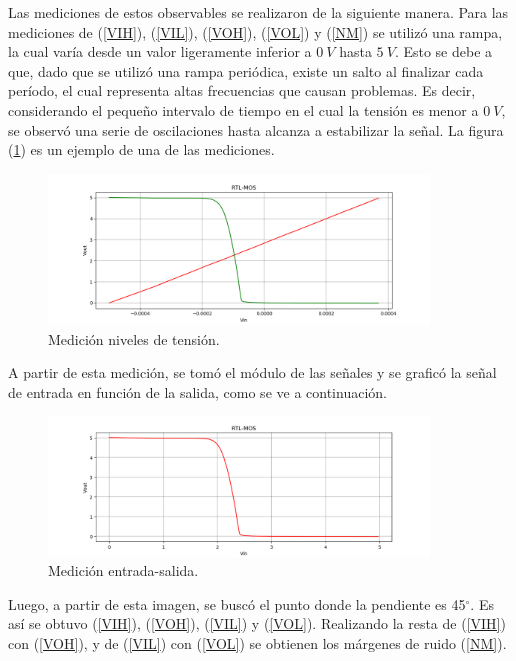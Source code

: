 Las mediciones de estos observables se realizaron de la siguiente manera. Para las mediciones de (\ref{VIH}), (\ref{VIL}), (\ref{VOH}), (\ref{VOL}) y (\ref{NM}) se utilizó una rampa, la cual varía desde un valor ligeramente inferior a $0 \ V$ hasta $5 \ V$. Esto se debe a que, dado que se utilizó una rampa periódica, existe un salto al finalizar cada período, el cual representa altas frecuencias que causan problemas. Es decir, considerando el pequeño intervalo de tiempo en el cual la tensión es menor a $0 \ V$, se observó una serie de oscilaciones hasta alcanza a estabilizar la señal. La figura (\ref{fig:medramp}) es un ejemplo de una de las mediciones.
\begin{figure}[H]	
	\centering
	\includegraphics[width=0.9\textwidth]{ImagenesEjercicio1/DC-SWEEP/MedicionRampa.PNG}
	\caption{Medición niveles de tensión.}
	\label{fig:medramp}
\end{figure}

A partir de esta medición, se tomó el módulo de las señales y se graficó la señal de entrada en función de la salida, como se ve a continuación.
\begin{figure}[H]	
	\centering
	\includegraphics[width=0.9\textwidth]{ImagenesEjercicio1/DC-SWEEP/EntradaSalida.PNG}
	\caption{Medición entrada-salida.}
	\label{fig:medinout}
\end{figure}

Luego, a partir de esta imagen, se buscó el punto donde la pendiente es 45$^{\circ}$. Es así se obtuvo (\ref{VIH}), (\ref{VOH}), (\ref{VIL}) y (\ref{VOL}). Realizando la resta de (\ref{VIH}) con (\ref{VOH}), y de (\ref{VIL}) con (\ref{VOL}) se obtienen los márgenes de ruido (\ref{NM}).

